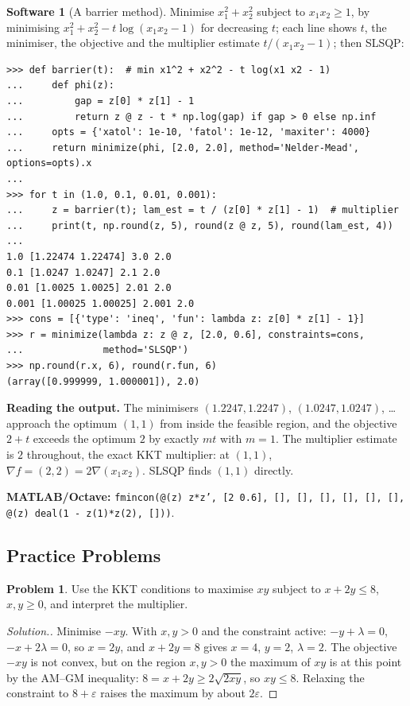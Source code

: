\documentclass[11pt,a4paper]{article}
\numberwithin{equation}{section}
\theoremstyle{definition}
\newtheorem{software}[thm]{Software}
\newtheorem{problemx}{Problem}[subsection]
\newenvironment{problem}{\begin{problemx}}{\end{problemx}}
\newenvironment{solution}
  {\renewcommand{\qedsymbol}{}\begin{proof}[\textit{Solution}.]}
  {\end{proof}}
\begin{document}
\begin{software}[A barrier method]
\label{sw:barrier}
Minimise $x_1^2 + x_2^2$ subject to $x_1x_2 \geq 1$, by minimising $x_1^2 + x_2^2 - t\log(x_1x_2 - 1)$ for decreasing $t$; each line shows $t$, the minimiser, the objective and the multiplier estimate $t/(x_1x_2 - 1)$; then SLSQP:
{\small\begin{verbatim}
>>> def barrier(t):  # min x1^2 + x2^2 - t log(x1 x2 - 1)
...     def phi(z):
...         gap = z[0] * z[1] - 1
...         return z @ z - t * np.log(gap) if gap > 0 else np.inf
...     opts = {'xatol': 1e-10, 'fatol': 1e-12, 'maxiter': 4000}
...     return minimize(phi, [2.0, 2.0], method='Nelder-Mead', options=opts).x
...
>>> for t in (1.0, 0.1, 0.01, 0.001):
...     z = barrier(t); lam_est = t / (z[0] * z[1] - 1)  # multiplier
...     print(t, np.round(z, 5), round(z @ z, 5), round(lam_est, 4))
...
1.0 [1.22474 1.22474] 3.0 2.0
0.1 [1.0247 1.0247] 2.1 2.0
0.01 [1.0025 1.0025] 2.01 2.0
0.001 [1.00025 1.00025] 2.001 2.0
>>> cons = [{'type': 'ineq', 'fun': lambda z: z[0] * z[1] - 1}]
>>> r = minimize(lambda z: z @ z, [2.0, 0.6], constraints=cons,
...              method='SLSQP')
>>> np.round(r.x, 6), round(r.fun, 6)
(array([0.999999, 1.000001]), 2.0)
\end{verbatim}}
\textbf{Reading the output.} The minimisers $(1.2247, 1.2247)$, $(1.0247, 1.0247)$, \ldots approach the optimum $(1, 1)$ from inside the feasible region, and the objective $2 + t$ exceeds the optimum $2$ by exactly $mt$ with $m = 1$. The multiplier estimate is $2$ throughout, the exact KKT multiplier: at $(1, 1)$,
$\nabla f = (2, 2) = 2\nabla(x_1x_2)$. SLSQP finds $(1, 1)$ directly.

\textbf{MATLAB/Octave:} \texttt{fmincon(@(z) z*z', [2 0.6], [], [], [], [], [], [], @(z) deal(1 - z(1)*z(2), []))}.
\end{software}

\subsection{Practice Problems}

\begin{problem}
Use the KKT conditions to maximise $xy$ subject to $x + 2y \leq 8$, $x, y \geq 0$, and interpret the multiplier.
\end{problem}

\begin{solution}
Minimise $-xy$. With $x, y > 0$ and the constraint active: $-y + \lambda = 0$, $-x + 2\lambda = 0$, so $x = 2y$, and $x + 2y = 8$ gives $x = 4$, $y = 2$, $\lambda = 2$. The objective $-xy$ is not convex, but on the region $x, y > 0$ the maximum of $xy$ is at this point by the AM--GM inequality: $8 = x + 2y \geq 2\sqrt{2xy}$, so
$xy \leq 8$. Relaxing the constraint to $8 + \varepsilon$ raises the maximum by about $2\varepsilon$.
\end{solution}
\end{document}

